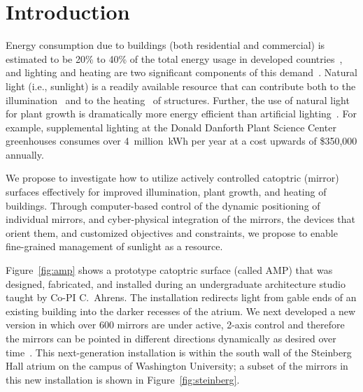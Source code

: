 \section{Introduction}
\label{sec:intro}


Energy consumption due to buildings (both residential and commercial)
is estimated to be 20\% to 40\% of the total energy usage in
developed countries~\cite{pop08}, and
lighting and heating are two significant components of this demand~\cite{keh05}.
Natural light (i.e., sunlight) is a readily available resource that
can contribute both to the illumination~\cite{Leslie03}
and to the heating~\cite{Lunde80} of structures.
Further, the use of natural light for plant growth is dramatically more
energy efficient than artificial lighting~\cite{Bugbee16}.
For example, supplemental lighting at the Donald Danforth Plant Science Center
greenhouses consumes over 4~million~kWh per year at a cost upwards of
\$350,000 annually.

We propose to investigate how to utilize actively
controlled catoptric (mirror) surfaces effectively for improved illumination,
plant growth, and heating of buildings.  Through computer-based control of
the dynamic positioning of
individual mirrors, and cyber-physical integration of the mirrors,
the devices
that orient them, and customized objectives and
constraints,
we propose to enable fine-grained management of sunlight as a resource.

Figure~\ref{fig:amp} shows a prototype catoptric surface (called AMP) that was 
designed, fabricated, and installed during an undergraduate architecture studio 
taught by Co-PI C.~Ahrens. The installation redirects light from gable ends of an 
existing building into the darker recesses of the atrium.
We next developed a
new version in which over 600 mirrors are under 
active, 2-axis control and therefore the mirrors
can be pointed in different directions dynamically as desired over
time~\cite{acmbg19,acmb18,cagm18}. 
This next-generation installation is within 
the south wall of the Steinberg Hall atrium on the campus of 
Washington University; a subset of the mirrors in this new
installation is shown in Figure~\ref{fig:steinberg}.

